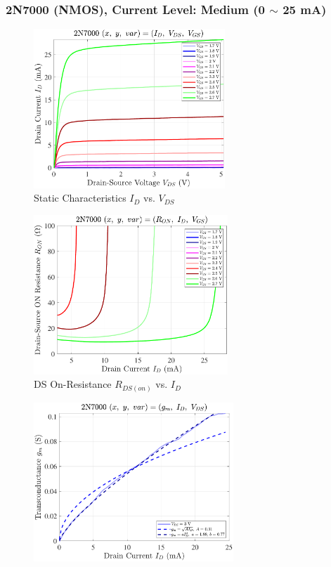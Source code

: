 \documentclass[UTF8]{article}
\begin{document}

\newpage
\subsubsection{2N7000 (NMOS), Current Level: Medium (0 $\sim$ 25 mA)}

\begin{center}
\noindent\begin{minipage}{0.45\columnwidth}
    \begin{figure}[H]\centering
        \includegraphics[height=170pt]{LCE-04-场效应管/assets/2N7000/2N7000 (NMOS) [onsemi, KH32] current level mid (0~25mA)/2025-04-24_00-04-22__stc_Id_Vds_Vgs.pdf}
        \caption{Static Characteristics $I_D$ vs. $V_{DS}$}
    \end{figure}
    \begin{figure}[H]\centering
        \includegraphics[height=170pt]{LCE-04-场效应管/assets/2N7000/2N7000 (NMOS) [onsemi, KH32] current level mid (0~25mA)/2025-04-24_00-00-07__stc_Ron_Id_Vgs.pdf}
        \caption{DS On-Resistance $R_{DS(on)}$ vs. $I_D$}
    \end{figure}
    \begin{figure}[H]\centering
        \includegraphics[height=170pt]{LCE-04-场效应管/assets/2N7000/2N7000 (NMOS) [onsemi, KH32] current level mid (0~25mA)/2025-04-24_00-04-29__stc_gm_Id_Vds.pdf}

\end{figure}
\end{minipage}
\end{center}
\end{document}
